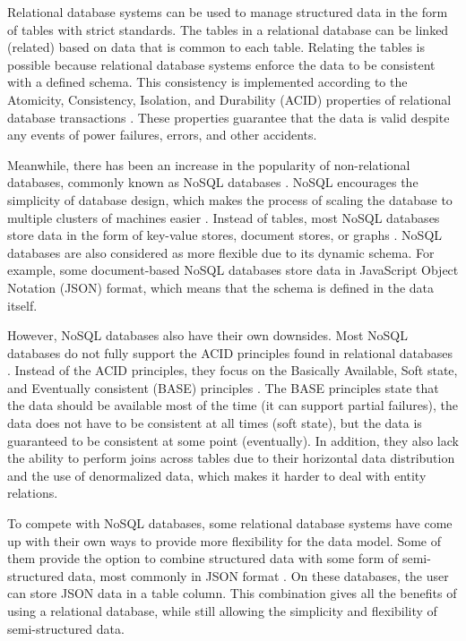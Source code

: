 Relational database systems can be used to manage structured data in the form
of tables with strict standards. The tables in a relational database can be
linked (related) based on data that is common to each table. Relating the
tables is possible because relational database systems enforce the data to be
consistent with a defined schema. This consistency is implemented according to
the Atomicity, Consistency, Isolation, and Durability (ACID) properties of
relational database transactions \cite{abramova_nosql}. These properties
guarantee that the data is valid despite any events of power failures, errors,
and other accidents.

Meanwhile, there has been an increase in the popularity of non-relational
databases, commonly known as NoSQL databases \cite{paul_nosql}. NoSQL
encourages the simplicity of database design, which makes the process of
scaling the database to multiple clusters of machines easier
\cite{leavitt_nosql}. Instead of tables, most NoSQL databases store data in the
form of key-value stores, document stores, or graphs \cite{strauch_nosql}.
NoSQL databases are also considered as more flexible due to its dynamic schema.
For example, some document-based NoSQL databases store data in JavaScript
Object Notation (JSON) format, which means that the schema is defined in the
data itself.

However, NoSQL databases also have their own downsides. Most NoSQL databases do
not fully support the ACID principles found in relational databases
\cite{cattell_nosql}. Instead of the ACID principles, they focus on the
Basically Available, Soft state, and Eventually consistent (BASE) principles
\cite{abramova_nosql}. The BASE principles state that the data should be
available most of the time (it can support partial failures), the data does not
have to be consistent at all times (soft state), but the data is guaranteed to
be consistent at some point (eventually). In addition, they also lack the
ability to perform joins across tables due to their horizontal data
distribution \cite{pokorny_nosql} and the use of denormalized data, which makes
it harder to deal with entity relations.

To compete with NoSQL databases, some relational database systems have come up
with their own ways to provide more flexibility for the data model. Some of
them provide the option to combine structured data with some form of
semi-structured data, most commonly in JSON format \cite{mariadb_json}. On
these databases, the user can store JSON data in a table column. This
combination gives all the benefits of using a relational database, while still
allowing the simplicity and flexibility of semi-structured data.

